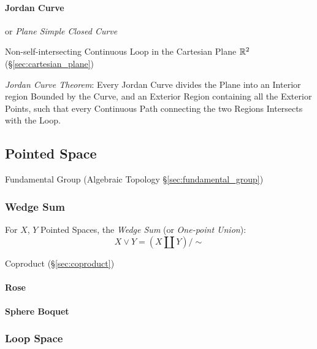 \paragraph{Jordan Curve}\label{sec:jordan_curve}\hfill

or \emph{Plane Simple Closed Curve}

Non-self-intersecting Continuous Loop in the Cartesian Plane $\mathbb{R}^2$
(\S\ref{sec:cartesian_plane})

\emph{Jordan Curve Theorem}: Every Jordan Curve divides the Plane into an
Interior region Bounded by the Curve, and an Exterior Region containing all the
Exterior Points, such that every Continuous Path connecting the two Regions
Intersects with the Loop.



\subsection{Pointed Space}\label{sec:pointed_space}

\fist Fundamental Group (Algebraic Topology \S\ref{sec:fundamental_group})



\subsubsection{Wedge Sum}\label{sec:wedge_sum}

For $X$, $Y$ Pointed Spaces, the \emph{Wedge Sum} (or \emph{One-point
  Union}):
\[
  X \vee Y = (X \amalg Y) / \sim
\]

Coproduct (\S\ref{sec:coproduct})



\paragraph{Rose}\label{sec:rose}\hfill

\paragraph{Sphere Boquet}\label{sec:sphere_boquet}\hfill



\subsubsection{Loop Space}\label{sec:loop_space}

